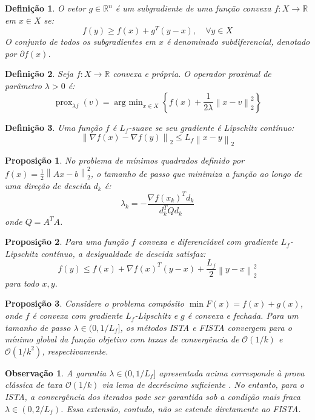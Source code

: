 \documentclass[12pt]{article}
\newtheorem{observation}{Observação}
\newtheorem{definition}{Definição}
\newtheorem{proposition}{Proposição}
\DeclareMathOperator{\prox}{prox}
\DeclareMathOperator*{\argmin}{arg\ min}
\newcommand{\norm}[1]{\left\lVert#1\right\rVert}
\begin{document}
\begin{definition}
O vetor $g \in \mathbb{R}^n$ é um subgradiente de uma função convexa $f : X \to \mathbb{R}$ em $x \in X$ se:
\[
f(y) \geq f(x) + g^T (y-x), \quad \forall y \in X
\]
O conjunto de todos os subgradientes em $x$ é denominado subdiferencial, denotado por $\partial f(x)$.
\end{definition}

\begin{definition}
Seja $f : X \to \mathbb{R}$ convexa e própria. O operador proximal de parâmetro $\lambda > 0$ é:
\[
\prox_{\lambda f}(v) = \argmin_{x\in X}\left\{f(x) + \frac{1}{2\lambda}\norm{x - v}_2^2 \right\}
\]
\end{definition}

\begin{definition}
Uma função $f$ é $L_f$-suave se seu gradiente é Lipschitz contínuo:
\[
\norm{\nabla f(x) - \nabla f(y)}_2 \leq L_f \norm{x - y}_2
\]
\end{definition}

\begin{proposition}
No problema de mínimos quadrados definido por $f(x) = \frac{1}{2} \norm{Ax - b}_2^2$, o tamanho de passo que minimiza a função ao longo de uma direção de descida $d_k$ é:
\[
\lambda_k = -\frac{\nabla f(x_k)^T d_k}{d_k^T Q d_k}
\]
onde $Q = A^T A$.
\end{proposition}

\begin{proposition}
Para uma função $f$ convexa e diferenciável com gradiente $L_f$-Lipschitz contínuo, a desigualdade de descida satisfaz:
\[
f(y) \leq f(x) + \nabla f(x)^T(y-x) + \frac{L_f}{2}\norm{y-x}_2^2
\]
para todo $x,y$.
\end{proposition}

\begin{proposition}
Considere o problema compósito $\min F(x) = f(x) + g(x)$, onde $f$ é convexa com gradiente $L_f$-Lipschitz e $g$ é convexa e fechada. Para um tamanho de passo $\lambda \in (0, 1/L_f]$, os métodos ISTA e FISTA convergem para o mínimo global da função objetivo com taxas de convergência de $\mathcal{O}(1/k)$ e $\mathcal{O}(1/k^2)$, respectivamente.
\end{proposition}

\begin{observation}
A garantia $\lambda \in (0, 1/L_f]$ apresentada acima corresponde à prova clássica de taxa $\mathcal{O}(1/k)$ via lema de decréscimo suficiente \cite{bet09}. No entanto, para o ISTA, a convergência dos iterados pode ser garantida sob a condição mais fraca $\lambda \in (0, 2/L_f)$. Essa extensão, contudo, não se estende diretamente ao FISTA.
\end{observation}
\end{document}
